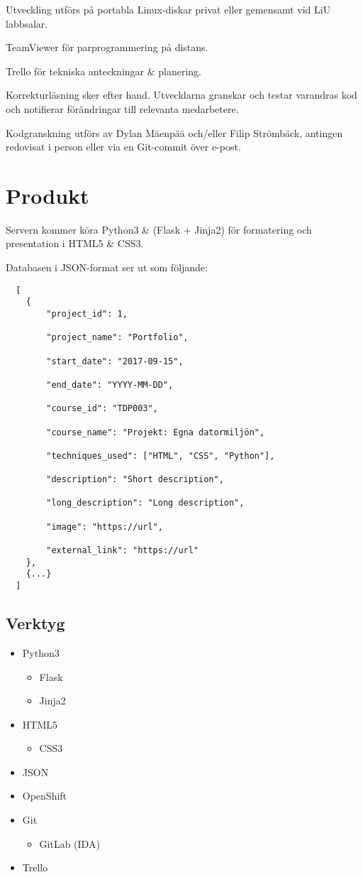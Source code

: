\documentclass{TDP003mall}
\begin{document}
  Utveckling utförs på portabla Linux-diskar privat eller gemensamt vid LiU labbsalar.

  TeamViewer för parprogrammering på distans.

  Trello för tekniska anteckningar \& planering.

  Korrekturläsning sker efter hand. Utvecklarna granskar och testar varandras kod och notifierar förändringar till relevanta medarbetere.

  Kodgranskning utförs av Dylan Mäenpää och/eller Filip Strömbäck, antingen redovisat i person eller via en Git-commit över e-post.


\section{Produkt}
  Servern kommer köra Python3 \& (Flask + Jinja2) för formatering och presentation i HTML5 \& CSS3.

  Databasen i JSON-format ser ut som följande:
  \begin{lstlisting}
  [
  	{
  		"project_id": 1,

  		"project_name": "Portfolio",

  		"start_date": "2017-09-15",

  		"end_date": "YYYY-MM-DD",

  		"course_id": "TDP003",

  		"course_name": "Projekt: Egna datormiljön",

  		"techniques_used": ["HTML", "CSS", "Python"],

  		"description": "Short description",

  		"long_description": "Long description",

  		"image": "https://url",

  		"external_link": "https://url"
  	},
    {...}
  ]
  \end{lstlisting}

\subsection{Verktyg}
  \begin{itemize}
    \item{Python3}
    \begin{itemize}
      \item{Flask}
      \item{Jinja2}
    \end{itemize}
    \item{HTML5}
    \begin{itemize}
      \item{CSS3}
    \end{itemize}
    \item{JSON}
    \item{OpenShift}
    \item{Git}
    \begin{itemize}
      \item{GitLab (IDA)}
    \end{itemize}
    \item{Trello}
  \end{itemize}
\end{document}
